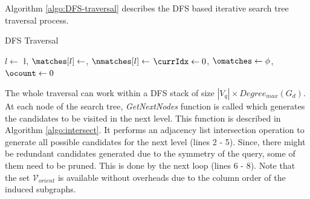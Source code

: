 Algorithm \ref{algo:DFS-traversal} describes the DFS based iterative search tree traversal process.

\begin{algorithm}
    \caption{DFS Traversal}
    \label{algo:DFS-traversal}
    \small



    $l \leftarrow $ \l, $\matches[l] \leftarrow $\imatches, $\nmatches[l] \leftarrow $\isize\;
    $ \currIdx \leftarrow 0$, $\omatches \leftarrow \phi $, $\ocount \leftarrow 0$  \;
\end{algorithm}

The whole traversal can work within a DFS stack of size $|V_q|\times Degree_{max}(G_d)$.
At each node of the search tree, \textit{GetNextNodes} function is called which generates the candidates to be visited in the next level.
This function is described in Algorithm \ref{algo:intersect}.
It performs an adjacency list intersection operation to generate all possible candidates for the next level (lines 2 - 5).
Since, there might be redundant candidates generated due to the symmetry of the query, some of them need to be pruned. This is done by the next loop (lines 6 - 8).
Note that the set $\mathcal{V}_{orient}$ is available without overheads due to the column order of the induced subgraphs.

